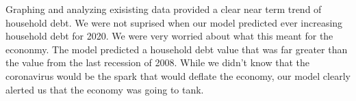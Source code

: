 \documentclass[sigconf,nonacm,11pt]{acmart}
\begin{document}
Graphing and analyzing exisisting data provided a clear near term trend of household debt. We were not suprised when our model predicted ever increasing household debt for 2020. We were very worried about what this meant for the econonmy. The model predicted a household debt value that was far greater than the value from the last recession of 2008.  While we didn't know that the coronavirus would be the spark that would deflate the economy, our model clearly alerted us that the economy was going to tank.



\end{document}
